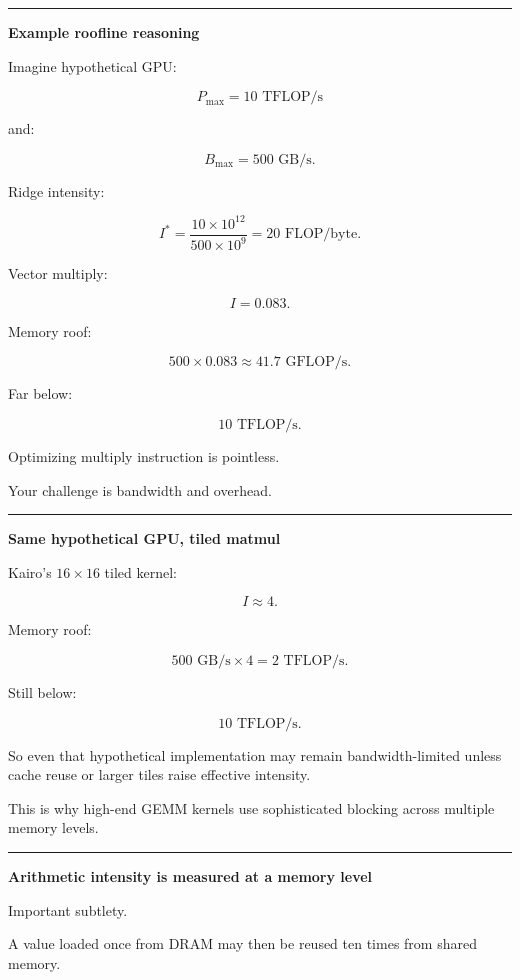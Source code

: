 \begin{center}\rule{0.5\linewidth}{0.5pt}\end{center}

\textbf{Example roofline reasoning}

Imagine hypothetical GPU:

\[
P_{\max}=10\text{ TFLOP/s}
\]

and:

\[
B_{\max}=500\text{ GB/s}.
\]

Ridge intensity:

\[
I^*
=
\frac{
10\times10^{12}
}{
500\times10^9
}
=
20\text{ FLOP/byte}.
\]

Vector multiply:

\[
I=0.083.
\]

Memory roof:

\[
500\times0.083
\approx41.7\text{ GFLOP/s}.
\]

Far below:

\[
10\text{ TFLOP/s}.
\]

Optimizing multiply instruction is pointless.

Your challenge is bandwidth and overhead.

\begin{center}\rule{0.5\linewidth}{0.5pt}\end{center}

\textbf{Same hypothetical GPU, tiled matmul}

Kairo's \(16\times16\) tiled kernel:

\[
I\approx4.
\]

Memory roof:

\[
500\text{ GB/s}
\times
4
=
2\text{ TFLOP/s}.
\]

Still below:

\[
10\text{ TFLOP/s}.
\]

So even that hypothetical implementation may remain bandwidth-limited unless cache reuse or larger tiles raise effective intensity.

This is why high-end GEMM kernels use sophisticated blocking across multiple memory levels.

\begin{center}\rule{0.5\linewidth}{0.5pt}\end{center}

\textbf{Arithmetic intensity is measured at a memory level}

Important subtlety.

A value loaded once from DRAM may then be reused ten times from shared memory.

